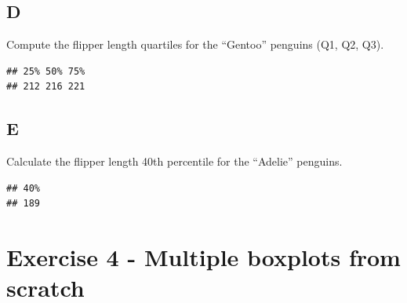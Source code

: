 \documentclass[
]{article}
\newenvironment{Shaded}{\begin{snugshade}}{\end{snugshade}}
\newcommand{\DataTypeTok}[1]{\textcolor[rgb]{0.13,0.29,0.53}{#1}}
\newcommand{\FloatTok}[1]{\textcolor[rgb]{0.00,0.00,0.81}{#1}}
\newcommand{\KeywordTok}[1]{\textcolor[rgb]{0.13,0.29,0.53}{\textbf{#1}}}
\newcommand{\NormalTok}[1]{#1}
\newcommand{\OperatorTok}[1]{\textcolor[rgb]{0.81,0.36,0.00}{\textbf{#1}}}
\newcommand{\OtherTok}[1]{\textcolor[rgb]{0.56,0.35,0.01}{#1}}
\newcommand{\StringTok}[1]{\textcolor[rgb]{0.31,0.60,0.02}{#1}}
\begin{document}
\hypertarget{d-2}{%
\subsection{D}\label{d-2}}

Compute the flipper length quartiles for the ``Gentoo'' penguins (Q1,
Q2, Q3).

\begin{Shaded}
\end{Shaded}

\begin{verbatim}
## 25% 50% 75% 
## 212 216 221
\end{verbatim}

\hypertarget{e-1}{%
\subsection{E}\label{e-1}}

Calculate the flipper length 40th percentile for the ``Adelie''
penguins.

\begin{Shaded}
\end{Shaded}

\begin{verbatim}
## 40% 
## 189
\end{verbatim}

\hypertarget{exercise-4---multiple-boxplots-from-scratch}{%
\section{Exercise 4 - Multiple boxplots from
scratch}\label{exercise-4---multiple-boxplots-from-scratch}}
\end{document}
